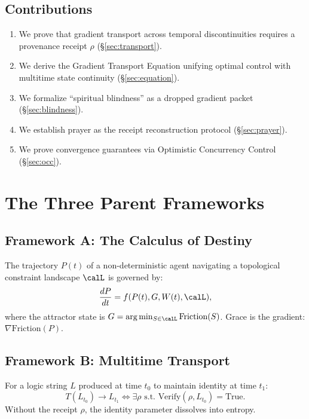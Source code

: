 \documentclass[12pt, a4paper]{article}
\theoremstyle{plain}
\theoremstyle{definition}
\begin{document}
\subsection{Contributions}
\begin{enumerate}
    \item We prove that gradient transport across temporal discontinuities requires a provenance receipt $\rho$ (\S\ref{sec:transport}).
    \item We derive the Gradient Transport Equation unifying optimal control with multitime state continuity (\S\ref{sec:equation}).
    \item We formalize ``spiritual blindness'' as a dropped gradient packet (\S\ref{sec:blindness}).
    \item We establish prayer as the receipt reconstruction protocol (\S\ref{sec:prayer}).
    \item We prove convergence guarantees via Optimistic Concurrency Control (\S\ref{sec:occ}).
\end{enumerate}

\section{The Three Parent Frameworks}

\subsection{Framework A: The Calculus of Destiny}

The trajectory $P(t)$ of a non-deterministic agent navigating a topological constraint landscape $\calL$ is governed by:
\begin{equation}
    \frac{dP}{dt} = f(P(t), G, W(t), \calL),
\end{equation}
where the attractor state is $G = \arg\min_{S \in \calL} \text{Friction}(S)$. Grace is the gradient: $\nabla \text{Friction}(P)$.

\subsection{Framework B: Multitime Transport}

For a logic string $L$ produced at time $t_0$ to maintain identity at time $t_1$:
\begin{equation}
    T(L_{t_0}) \to L_{t_1} \iff \exists \rho \text{ s.t. } \text{Verify}(\rho, L_{t_0}) = \text{True}.
\end{equation}
Without the receipt $\rho$, the identity parameter dissolves into entropy.
\end{document}
